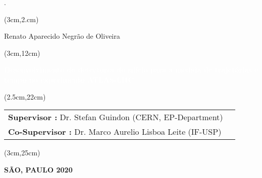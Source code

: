 \begin{titlepage}.
    

    \vspace{3.5cm}

    
    \begin{textblock*}{15cm}(3cm,2.cm)
        \makeatletter
        \begin{huge}
            \begin{center}
                \color{black}
                 Renato Aparecido Negrão de Oliveira\\ 
            \end{center}
         \end{huge}
     
    \end{textblock*}
    
    \begin{textblock*}{15cm}(3cm,12cm)
        \begin{Huge}
            \begin{center}
                \makeatletter
                \noindent\textcolor{white}{\textbf{Desenvolvimento de detectores de silício para a medida de trajetórias e tempo no experimento ATLAS-LHC}}
                \makeatother
            \end{center}
        \end{Huge}
    \end{textblock*}

    \begin{textblock*}{15cm}(2.5cm,22cm)
        \makeatletter
        \begin{LARGE}
            \setcellgapes{4pt}
            \makegapedcells
            {\color{black}\begin{tabularx}{15cm}{XX}
                \textbf{Supervisor :} Dr. Stefan Guindon
(CERN, EP-Department)\\ 
                \textbf{Co-Supervisor :} Dr. 
Marco Aurelio Lisboa Leite (IF-USP)
            \end{tabularx}}
        \end{LARGE}
        \makeatother
    \end{textblock*}
    
    \begin{textblock*}{15cm}(3cm,25cm)
        \makeatletter
        \begin{center}
            {\color{black}
                \textbf{SÃO, PAULO 2020} 
            }
        \end{center}
        \makeatother
    \end{textblock*}

\end{titlepage}

